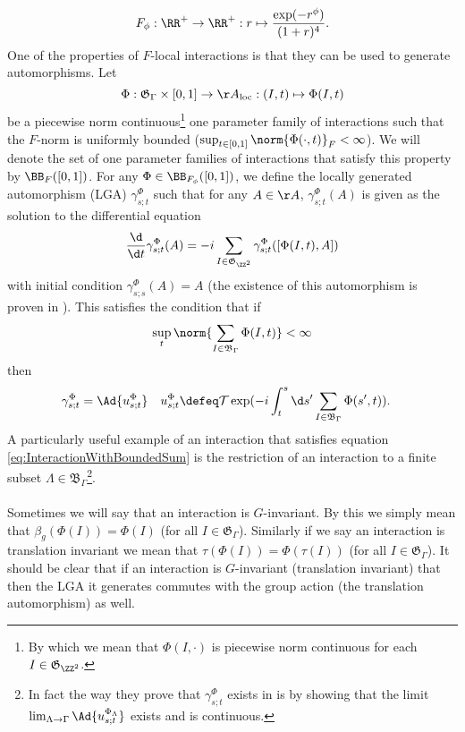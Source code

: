 \begin{equation}\label{eq:OurFFunction}
F_\phi:\RR^+\rightarrow\RR^+:r\mapsto \frac{\exp(-r^\phi)}{(1+r)^4}.
\end{equation}
One of the properties of $F$-local interactions is that they can be used to generate automorphisms. Let
\begin{equation}
\Phi:\mathfrak{G}_{\Gamma}\times [0,1]\rightarrow \AA_{\text{loc}}:(I,t)\mapsto \Phi(I,t)
\end{equation}
be a piecewise norm continuous\footnote{By which we mean that $\Phi(I,\cdot)$ is piecewise norm continuous for each $I\in\mathfrak{G}_{\ZZ^2}$.} one parameter family of interactions such that the $F$-norm is uniformly bounded ($\sup_{t\in[0,1]}\norm{\Phi(\cdot,t)}_F<\infty$). We will denote the set of one parameter families of interactions that satisfy this property by $\BB_{F}([0,1])$. For any $\Phi\in\BB_{F_\phi}([0,1])$, we define the locally generated automorphism (LGA) $\gamma^{\Phi}_{s;t}$ such that for any $A\in\AA$, $\gamma^{\Phi}_{s;t}(A)$ is given as the solution to the differential equation
\begin{equation}
\frac{\d}{\d t}\gamma^{\Phi}_{s;t}(A)=-i\sum_{I\in\mathfrak{G}_{\ZZ^2}}\gamma^{\Phi}_{s;t}([\Phi(I,t),A])
\end{equation}
with initial condition $\gamma^{\Phi}_{s;s}(A)=A$ (the existence of this automorphism is proven in \cite{nachtergaele2019quasi}). This satisfies the condition that if
\begin{equation}\label{eq:InteractionWithBoundedSum}
\sup_t\norm{\sum_{I\in\mathfrak{B}_{\Gamma}}\Phi(I,t)}<\infty
\end{equation}
then
\begin{align}
\gamma^\Phi_{s;t}&=\Ad{u^\Phi_{s;t}}&u^\Phi_{s;t}&\defeq\mathcal{T}\exp(-i\int_t^s\d s'\sum_{I\in\mathfrak{B}_{\Gamma}}\Phi(s',t)).
\end{align}
A particularly useful example of an interaction that satisfies equation \eqref{eq:InteractionWithBoundedSum} is the restriction of an interaction to a finite subset $\Lambda\in\mathfrak{B}_\Gamma$\footnote{In fact the way they prove that $\gamma^\Phi_{s;t}$ exists in \cite{nachtergaele2019quasi} is by showing that the limit $\lim_{\Lambda\rightarrow\Gamma}\Ad{u^{\Phi_\Lambda}_{s;t}}$ exists and is continuous.}.\\\\
Sometimes we will say that an interaction is $G$-invariant. By this we simply mean that $\beta_g(\Phi(I))=\Phi(I)$ (for all $I\in\mathfrak{G}_{\Gamma}$). Similarly if we say an interaction is translation invariant we mean that $\tau(\Phi(I))=\Phi(\tau(I))$ (for all $I\in\mathfrak{G}_{\Gamma}$). It should be clear that if an interaction is $G$-invariant (translation invariant) that then the LGA it generates commutes with the group action (the translation automorphism) as well.
